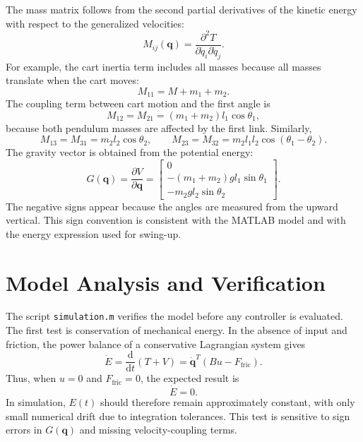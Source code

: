 \documentclass[11pt,a4paper]{article}
\newcommand{\sectionpage}{\clearpage}
\newcommand{\dd}{\mathrm{d}}
\begin{document}
The mass matrix follows from the second partial derivatives of the kinetic energy with respect to the generalized velocities:
\begin{equation}
    M_{ij}(\bm q)=
    \frac{\partial^2 T}{\partial \dot{q}_i\partial \dot{q}_j}.
\end{equation}
For example, the cart inertia term includes all masses because all masses translate when the cart moves:
\begin{equation}
    M_{11}=M+m_1+m_2.
\end{equation}
The coupling term between cart motion and the first angle is
\begin{equation}
    M_{12}=M_{21}=(m_1+m_2)l_1\cos\theta_1,
\end{equation}
because both pendulum masses are affected by the first link. Similarly,
\begin{equation}
    M_{13}=M_{31}=m_2l_2\cos\theta_2,\qquad
    M_{23}=M_{32}=m_2l_1l_2\cos(\theta_1-\theta_2).
\end{equation}
The gravity vector is obtained from the potential energy:
\begin{equation}
    G(\bm q)=\frac{\partial V}{\partial \bm q}
    =
    \begin{bmatrix}
        0\\
        -(m_1+m_2)gl_1\sin\theta_1\\
        -m_2gl_2\sin\theta_2
    \end{bmatrix}.
\end{equation}
The negative signs appear because the angles are measured from the upward vertical. This sign convention is consistent with the MATLAB model and with the energy expression used for swing-up.

\sectionpage
\section{Model Analysis and Verification}

The script \texttt{simulation.m} verifies the model before any controller is evaluated. The first test is conservation of mechanical energy. In the absence of input and friction, the power balance of a conservative Lagrangian system gives
\begin{equation}
    \dot{E}=\frac{\dd}{\dd t}(T+V)=\dot{\bm q}^{T}(Bu-F_{\mathrm{fric}}).
\end{equation}
Thus, when $u=0$ and $F_{\mathrm{fric}}=0$, the expected result is
\begin{equation}
    \dot{E}=0.
\end{equation}
In simulation, $E(t)$ should therefore remain approximately constant, with only small numerical drift due to integration tolerances. This test is sensitive to sign errors in $G(\bm q)$ and missing velocity-coupling terms.
\end{document}
